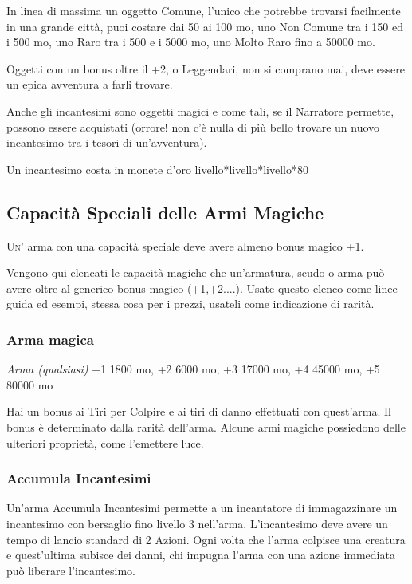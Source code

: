 \begin{multicols}{2}
In linea di massima un oggetto Comune, l'unico che potrebbe trovarsi facilmente in una grande città, puoi costare dai 50 ai 100 mo, uno Non Comune tra i 150 ed i 500 mo, uno Raro tra i 500 e i 5000 mo, uno Molto Raro fino a 50000 mo.

Oggetti con un bonus oltre il +2, o Leggendari, non si comprano mai, deve essere un epica avventura a farli trovare.



\medskip

Anche gli incantesimi sono oggetti magici e come tali, se il Narratore permette, possono essere acquistati (orrore! non c'è nulla di più bello trovare un nuovo incantesimo tra i tesori di un'avventura).

Un incantesimo costa in monete d'oro livello*livello*livello*80

\bigskip

\subsection{Capacità Speciali delle Armi Magiche}

\lettrine[lines=2, lhang=0.33, loversize=0.25, findent=1.5em]{U}{n'} arma con una capacità speciale deve avere almeno bonus magico +1.

Vengono qui elencati le capacità magiche che un'armatura, scudo o arma può avere oltre al generico bonus magico (+1,+2....). Usate questo elenco come linee guida ed esempi, stessa cosa per i prezzi, usateli come indicazione di rarità.

\subsubsection*{Arma magica}

\textit{Arma (qualsiasi)} +1 1800 mo, +2 6000 mo, +3 17000 mo, +4 45000 mo, +5 80000 mo

Hai un bonus ai Tiri per Colpire e ai tiri di danno effettuati con quest'arma. Il bonus è determinato dalla rarità dell'arma. Alcune armi magiche possiedono delle ulteriori proprietà, come l'emettere luce.

\subsubsection*{Accumula Incantesimi}

Un'arma Accumula Incantesimi permette a un incantatore di immagazzinare un incantesimo con bersaglio fino livello 3 nell'arma. L'incantesimo deve avere un tempo di lancio standard di 2 Azioni. Ogni volta che l'arma colpisce una creatura e quest'ultima subisce dei danni, chi impugna l'arma con una azione immediata può liberare l'incantesimo.


\end{multicols}
